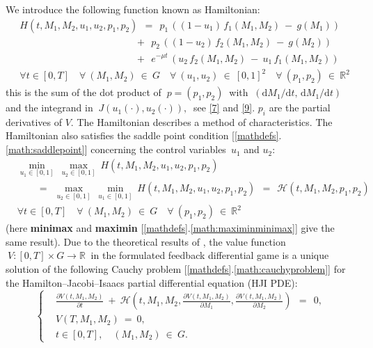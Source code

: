 \documentclass[11pt]{amsart}
\begin{document}
We introduce the following function known as Hamiltonian:
\begin{equation}
\begin{aligned}
& H(t, M_1, M_2, u_1, u_2, p_1, p_2) \:\: = \:\:
p_1 \, \left((1 - u_1) \, f_1(M_1, M_2) \: - \: g(M_1)\right) \\
& \qquad\qquad\qquad\qquad\qquad\quad \:\:\:\,
+ \:\: p_2 \, \left((1 - u_2) \, f_2(M_1, M_2) \: - \: g(M_2)\right) \\
& \qquad\qquad\qquad\qquad\qquad\quad \:\:\:\,
+ \:\: e^{-\mu t} \, (u_2 \, f_2(M_1, M_2) \: - \: u_1 \, f_1(M_1, M_2)) \\
& \forall t \in [0, T] \quad \forall \: (M_1, M_2) \: \in \: G \quad \forall
  \: (u_1, u_2) \: \in \: [0, 1]^2 \quad
\forall \: (p_1, p_2) \: \in \: \mathbb{R}^2
\end{aligned}  \label{12}
\end{equation}
this is the sum of the dot product of $ \: p = (p_1, p_2) \: $ with
$ \: (\mathrm{d} M_1 / \mathrm{d} t, \, \mathrm{d} M_1 / \mathrm{d} t) \: $ and
the integrand in $ \: J(u_1(\cdot), u_2(\cdot)), \: $ see \cref{7} and \cref{9}. $p_i$ are the partial derivatives of $V$.  The Hamiltonian describes a method of characteristics. The Hamiltonian also satisfies the saddle point condition [\ref{mathdefs}.\ref{math:saddlepoint}] concerning
the control variables~$ u_1 $ and
$ u_2 $:
\begin{equation}
\begin{aligned}
& \min_{u_1 \in [0, 1]} \: \max_{u_2 \in [0, 1]} \: H(t, M_1, M_2, u_1, u_2,
  p_1, p_2) \\
& \qquad
= \:\: \max_{u_2 \in [0, 1]} \: \min_{u_1 \in [0, 1]} \: H(t, M_1, M_2, u_1,
  u_2, p_1, p_2) \:\:
= \:\: \mathcal{H} (t, M_1, M_2, p_1, p_2) \\
& \forall t \in [0, T] \quad \forall \: (M_1, M_2) \: \in \: G \quad \forall
  \: (p_1, p_2) \: \in \: \mathbb{R}^2
\end{aligned}  \label{13}
\end{equation}
(here \textbf{minimax} and \textbf{maximin} [\ref{mathdefs}.\ref{math:maximinminimax}] give the same result). Due to the theoretical
results of \cite[\S XI.6]{FlemingSoner2006}, the value function 
$ \: V \colon [0, T] \times G \to \mathbb{R} \: $ in the formulated feedback
differential game is a unique solution of the following Cauchy problem [\ref{mathdefs}.\ref{math:cauchyproblem}] for the
Hamilton--Jacobi--Isaacs partial differential equation (HJI PDE):
\begin{equation}
\left\{ \begin{aligned}
& \frac{\partial V(t, M_1, M_2)}{\partial t} \: + \: \mathcal{H}
  \left( t, M_1, M_2, \frac{\partial V(t, M_1, M_2)}{\partial M_1},
  \frac{\partial V(t, M_1, M_2)}{\partial M_2} \right) \:\: = \:\: 0, \\
& V(T, M_1, M_2) \: = \: 0, \\
& t \in [0, T], \quad (M_1, M_2) \: \in \: G.
\end{aligned} \right.  \label{15}
\end{equation}
\end{document}
